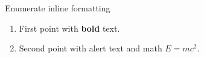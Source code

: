 \documentclass[14pt,t]{beamer}
\begin{document}
\begin{frame}{Enumerate inline formatting}
\begin{enumerate}
\item First point with \textbf{bold} text.
\item Second point with \alert{alert} text and math $E = mc^2$.
\end{enumerate}
\end{frame}
\end{document}
